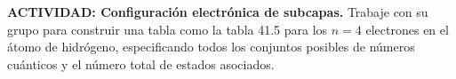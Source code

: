 \item \textbf{ACTIVIDAD: Configuración electrónica de subcapas.}
Trabaje con su grupo para construir una tabla como la tabla 41.5 para los $n = 4$ electrones en el átomo de hidrógeno, especificando todos los conjuntos posibles de números cuánticos y el número total de estados asociados.
